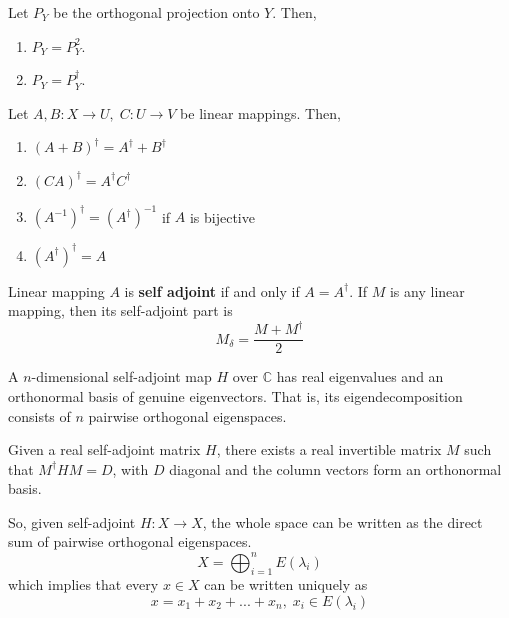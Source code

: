   \begin{theorem}
  Let $P_Y$ be the orthogonal projection onto $Y$. Then, 
  \begin{enumerate}
      \item $P_Y = P_Y^2$. 
      \item $P_Y = P_Y^\dagger$. 
  \end{enumerate}
  \end{theorem}

  \begin{theorem} Let $A, B: X \longrightarrow U, \; C: U \longrightarrow V$ be linear mappings. Then, 
  \begin{enumerate}
      \item $(A + B)^\dagger = A^\dagger + B^\dagger$
      \item $(C A)^\dagger = A^\dagger C^\dagger$
      \item $(A^{-1})^\dagger = (A^\dagger)^{-1}$ if $A$ is bijective
      \item $(A^\dagger)^\dagger = A$
  \end{enumerate}
  \end{theorem}

  \begin{definition}
  Linear mapping $A$ is \textbf{self adjoint} if and only if $A = A^\dagger$. If $M$ is any linear mapping, then its self-adjoint part is 
  \[M_\delta = \frac{M + M^\dagger}{2}\]
  \end{definition}

  \begin{theorem}
  A $n$-dimensional self-adjoint map $H$ over $\mathbb{C}$ has real eigenvalues and an orthonormal basis of genuine eigenvectors. That is, its eigendecomposition consists of $n$ pairwise orthogonal eigenspaces. 
  \end{theorem}

  \begin{corollary}
  Given a real self-adjoint matrix $H$, there exists a real invertible matrix $M$ such that $M^\dagger H M = D$, with $D$ diagonal and the column vectors form an orthonormal basis.

  So, given self-adjoint $H: X \longrightarrow X$, the whole space can be written as the direct sum of pairwise orthogonal eigenspaces. 
  \[X = \bigoplus_{i=1}^n E(\lambda_i)\]
  which implies that every $x \in X$ can be written uniquely as 
  \[x = x_1 + x_2 + ... + x_n, \; x_i \in E(\lambda_i) \]
  \end{corollary}

